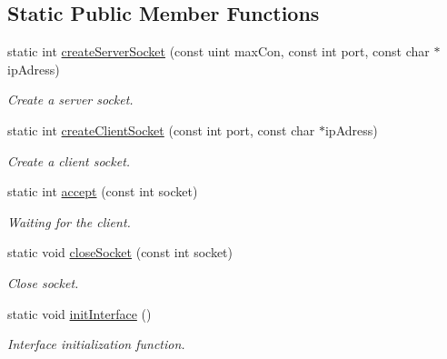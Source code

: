 \subsection*{Static Public Member Functions}
\begin{DoxyCompactItemize}
\item 
static int \mbox{\hyperlink{class_net_1_1_c_net_socket_interface_a250ab776d6ce77b1a905904dce7bf21f}{create\+Server\+Socket}} (const uint max\+Con, const int port, const char $\ast$ip\+Adress)
\begin{DoxyCompactList}\small\item\em Create a server socket. \end{DoxyCompactList}\item 
static int \mbox{\hyperlink{class_net_1_1_c_net_socket_interface_a52ca61f347f9f08cf0ad85e45f081906}{create\+Client\+Socket}} (const int port, const char $\ast$ip\+Adress)
\begin{DoxyCompactList}\small\item\em Create a client socket. \end{DoxyCompactList}\item 
static int \mbox{\hyperlink{class_net_1_1_c_net_socket_interface_a4fceb3945002b0aa62dbc7af4afac76d}{accept}} (const int socket)
\begin{DoxyCompactList}\small\item\em Waiting for the client. \end{DoxyCompactList}\item 
static void \mbox{\hyperlink{class_net_1_1_c_net_socket_interface_a32974d8d814e78f05208eec685376df5}{close\+Socket}} (const int socket)
\begin{DoxyCompactList}\small\item\em Close socket. \end{DoxyCompactList}\item 
\mbox{\label{class_net_1_1_c_net_socket_interface_a3f0603a3708ca966b9f37d9202761aa8}} 
static void \mbox{\hyperlink{class_net_1_1_c_net_socket_interface_a3f0603a3708ca966b9f37d9202761aa8}{init\+Interface}} ()
\begin{DoxyCompactList}\small\item\em Interface initialization function. \end{DoxyCompactList}\item 
\mbox{\label{class_net_1_1_c_net_socket_interface_a8d07a643a30977a250d611653d05e7d2}} 

\end{DoxyCompactItemize}
